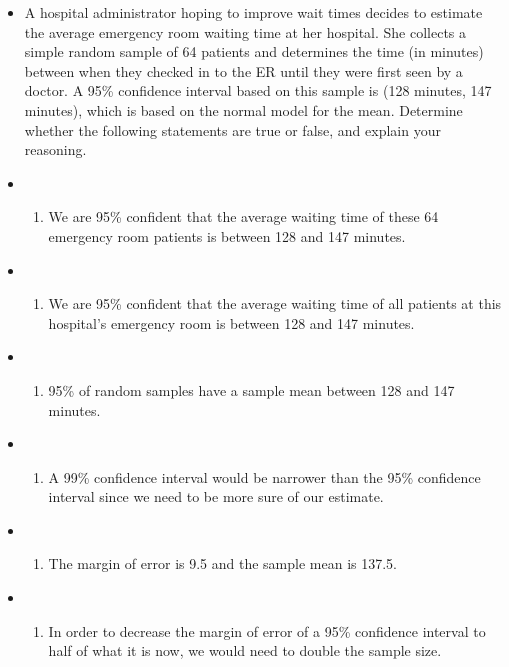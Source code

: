 \documentclass[]{book}
\providecommand{\tightlist}{%
  \setlength{\itemsep}{0pt}\setlength{\parskip}{0pt}}
\begin{document}
\begin{itemize}
\item
  A hospital administrator hoping to improve wait times decides to estimate the average emergency room waiting time at her hospital. She collects a simple random sample of 64 patients and determines the time (in minutes) between when they checked in to the ER until they were first seen by a doctor. A 95\% confidence interval based on this sample is (128 minutes, 147 minutes), which is based on the normal model for the mean. Determine whether the following statements are true or false, and explain your reasoning.
\item
  \begin{enumerate}
  \def\labelenumi{(\alph{enumi})}
  \tightlist
  \item
    We are 95\% confident that the average waiting time of these 64 emergency room patients is between 128 and 147 minutes.
  \end{enumerate}
\item
  \begin{enumerate}
  \def\labelenumi{(\alph{enumi})}
  \setcounter{enumi}{1}
  \tightlist
  \item
    We are 95\% confident that the average waiting time of all patients at this hospital's emergency room is
    between 128 and 147 minutes.
  \end{enumerate}
\item
  \begin{enumerate}
  \def\labelenumi{(\alph{enumi})}
  \setcounter{enumi}{2}
  \tightlist
  \item
    95\% of random samples have a sample mean between 128 and 147 minutes.
  \end{enumerate}
\item
  \begin{enumerate}
  \def\labelenumi{(\alph{enumi})}
  \setcounter{enumi}{3}
  \tightlist
  \item
    A 99\% confidence interval would be narrower than the 95\% confidence interval since we need to be more sure of our estimate.
  \end{enumerate}
\item
  \begin{enumerate}
  \def\labelenumi{(\alph{enumi})}
  \setcounter{enumi}{4}
  \tightlist
  \item
    The margin of error is 9.5 and the sample mean is 137.5.
  \end{enumerate}
\item
  \begin{enumerate}
  \def\labelenumi{(\alph{enumi})}
  \setcounter{enumi}{5}
  \tightlist
  \item
    In order to decrease the margin of error of a 95\% confidence interval to half of what it is now, we would need to double the sample size.
  \end{enumerate}
\end{itemize}
\end{document}
